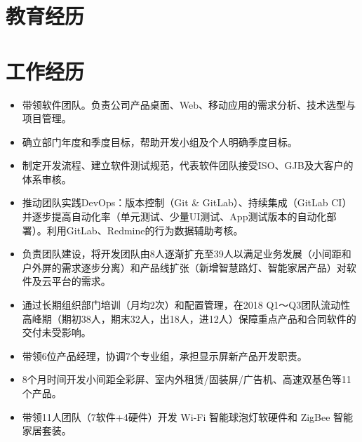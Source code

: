 \documentclass[10pt,a4paper]{moderncv/moderncv}
\begin{document}
\maketitle


\section{教育经历}

\section{工作经历}


{
\begin{itemize}
	\item 带领软件团队。负责公司产品桌面、Web、移动应用的需求分析、技术选型与项目管理。
	\item 确立部门年度和季度目标，帮助开发小组及个人明确季度目标。
	\item 制定开发流程、建立软件测试规范，代表软件团队接受ISO、GJB及大客户的体系审核。
	\item 推动团队实践DevOps：版本控制（Git \& GitLab）、持续集成（GitLab CI）并逐步提高自动化率（单元测试、少量UI测试、App测试版本的自动化部署）。利用GitLab、Redmine的行为数据辅助考核。
	\item 负责团队建设，将开发团队由8人逐渐扩充至39人以满足业务发展（小间距和户外屏的需求逐步分离）和产品线扩张（新增智慧路灯、智能家居产品）对软件及云平台的需求。
	\item 通过长期组织部门培训（月均2次）和配置管理，在2018 Q1～Q3团队流动性高峰期（期初38人，期末32人，出18人，进12人）保障重点产品和合同软件的交付未受影响。
\end{itemize}
}

{
\begin{itemize}
	\item 带领6位产品经理，协调7个专业组，承担显示屏新产品开发职责。
	\item 8个月时间开发小间距全彩屏、室内外租赁/固装屏/广告机、高速双基色等11个产品。
	\item 带领11人团队（7软件+4硬件）开发 Wi-Fi 智能球泡灯软硬件和 ZigBee 智能家居套装。
\end{itemize}
}
\end{document}
